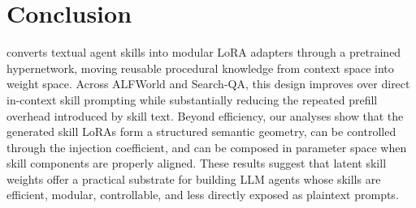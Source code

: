 \section{Conclusion}
\method{} converts textual agent skills into modular LoRA adapters through a pretrained hypernetwork, moving reusable procedural knowledge from context space into weight space. Across ALFWorld and Search-QA, this design improves over direct in-context skill prompting while substantially reducing the repeated prefill overhead introduced by skill text. Beyond efficiency, our analyses show that the generated skill LoRAs form a structured semantic geometry, can be controlled through the injection coefficient, and can be composed in parameter space when skill components are properly aligned. These results suggest that latent skill weights offer a practical substrate for building LLM agents whose skills are efficient, modular, controllable, and less directly exposed as plaintext prompts.